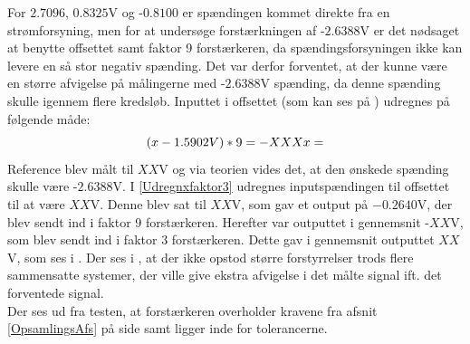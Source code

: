 For $2.7096$, $0.8325$V og -$0.8100$ er spændingen kommet direkte fra en strømforsyning, men for at undersøge forstærkningen af -$2.6388$V er det nødsaget at benytte offsettet samt faktor 9 forstærkeren, da spændingsforsyningen ikke kan levere en så stor negativ spænding. Det var derfor forventet, at der kunne være en større afvigelse på målingerne med -$2.6388$V spænding, da denne spænding skulle igennem flere kredsløb. Inputtet i offsettet (som kan ses på ) udregnes på følgende måde:
\begin{equation}\label{Udregnxfaktor3}
( x - 1.5902V ) * 9 = -XXX \\
x =
\end{equation}
Reference blev målt til $XX$V og via teorien vides det, at den ønskede spænding skulle være -$2.6388$V. I \eqref{Udregnxfaktor3} udregnes inputspændingen til offsettet til at være $XX$V. Denne blev sat til $XX$V, som gav et output på $-0.2640$V, der blev sendt ind i faktor 9 forstærkeren. Herefter var outputtet i gennemsnit -$XX$V, som blev sendt ind i faktor 3 forstærkeren. Dette gav i gennemsnit outputtet $XX$V, som ses i . %
Der ses i , at der ikke opstod større forstyrrelser trods flere sammensatte systemer, der ville give ekstra afvigelse i det målte signal ift. det forventede signal. \\
Der ses ud fra testen, at forstærkeren overholder kravene fra afsnit \ref{OpsamlingsAfs} på side \pageref{OpsamlingsAfs} samt ligger inde for tolerancerne.